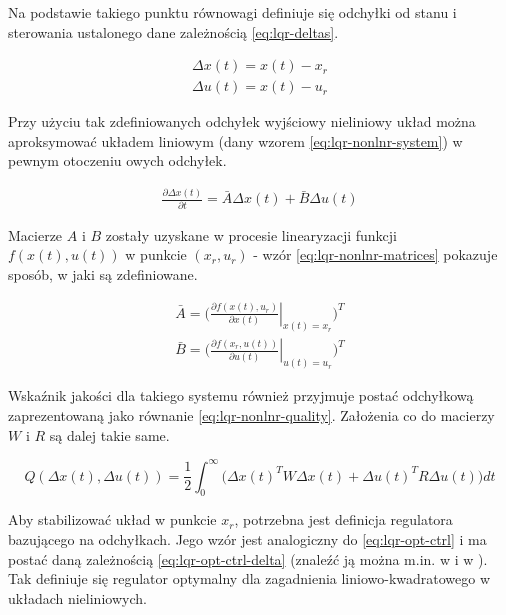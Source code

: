 Na podstawie takiego punktu równowagi definiuje się odchyłki od stanu i sterowania ustalonego dane zależnością \ref{eq:lqr-deltas}.

\begin{equation}\label{eq:lqr-deltas}
\begin{array}{lr}
    \Delta x(t) = x(t) - x_{r}\\
    \Delta u(t) = x(t) - u_{r}
\end{array}
\end{equation}

Przy użyciu tak zdefiniowanych odchyłek wyjściowy nieliniowy układ można aproksymować układem liniowym (dany wzorem \ref{eq:lqr-nonlnr-system}) w pewnym otoczeniu owych odchyłek.

\begin{equation}\label{eq:lqr-nonlnr-system}
\begin{array}{lr}
    \frac{\partial \Delta x(t)}{\partial t} = \bar{A}\Delta x(t) + \bar{B}\Delta u(t)
\end{array}
\end{equation}

Macierze $A$ i $B$ zostały uzyskane w procesie linearyzacji funkcji $f(x(t), u(t))$ w punkcie $(x_{r}, u_{r})$ - wzór \ref{eq:lqr-nonlnr-matrices} pokazuje sposób, w jaki są zdefiniowane.

\begin{equation}\label{eq:lqr-nonlnr-matrices}
\begin{array}{lr}
    \bar{A} = \bigg(\left. \frac{\partial f(x(t), u_{r})}{\partial x(t)}\right\vert_{x(t) = x_{r}}\bigg)^{T}\\
    \bar{B} = \bigg(\left. \frac{\partial f(x_{r}, u(t))}{\partial u(t)}\right\vert_{u(t) = u_{r}}\bigg)^{T}
\end{array}
\end{equation}

Wskaźnik jakości dla takiego systemu również przyjmuje postać odchyłkową zaprezentowaną jako równanie \ref{eq:lqr-nonlnr-quality}. Założenia co do macierzy $W$ i $R$ są dalej takie same.

\begin{equation}\label{eq:lqr-nonlnr-quality}
Q(\Delta x(t), \Delta u(t)) = \frac{1}{2}\int_{0}^{\infty} \Big( \Delta x(t)^{T}W\Delta x(t) + \Delta u(t)^{T}R\Delta u(t) \Big)dt
\end{equation}

Aby stabilizować układ w punkcie $x_{r}$, potrzebna jest definicja regulatora bazującego na odchyłkach.
Jego wzór jest analogiczny do \ref{eq:lqr-opt-ctrl} i ma postać daną zależnością \ref{eq:lqr-opt-ctrl-delta} (znaleźć ją można m.in. w \cite{Mitk2007} i w \cite{Korytowski2015}). Tak definiuje się regulator optymalny dla zagadnienia liniowo-kwadratowego w układach nieliniowych.

